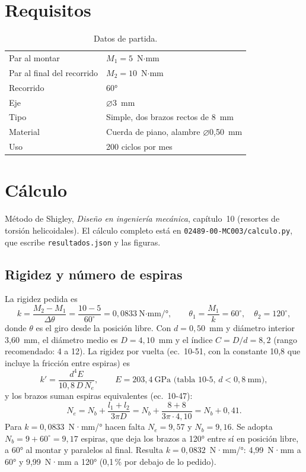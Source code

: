 \documentclass[11pt,a4paper]{article}
\begin{document}
\section{Requisitos}
\begin{table}[H]\centering\small
  \caption{Datos de partida.}
  \begin{tabular}{l l}
    \toprule
    Par al montar & $M_1 = 5$~N$\cdot$mm \\
    Par al final del recorrido & $M_2 = 10$~N$\cdot$mm \\
    Recorrido & 60° \\
    Eje & $\varnothing$3~mm \\
    Tipo & Simple, dos brazos rectos de 8~mm \\
    Material & Cuerda de piano, alambre $\varnothing$0,50~mm \\
    Uso & 200 ciclos por mes \\
    \bottomrule
  \end{tabular}
\end{table}

\section{Cálculo}
Método de Shigley, \emph{Diseño en ingeniería mecánica}, capítulo~10 (resortes de torsión helicoidales).
El cálculo completo está en \texttt{02489-00-MC003/calculo.py}, que escribe \texttt{resultados.json} y las figuras.

\subsection{Rigidez y número de espiras}
La rigidez pedida es
\[
  k = \frac{M_2 - M_1}{\Delta\theta} = \frac{10 - 5}{60^\circ} = 0{,}0833~\text{N·mm/°},
  \qquad \theta_1 = \frac{M_1}{k} = 60^\circ,\quad \theta_2 = 120^\circ,
\]
donde $\theta$ es el giro desde la posición libre. Con $d = 0{,}50$~mm y diámetro interior 3,60~mm, el
diámetro medio es $D = 4{,}10$~mm y el índice $C = D/d = 8{,}2$ (rango recomendado: 4 a 12).
La rigidez por vuelta (ec.~10-51, con la constante 10,8 que incluye la fricción entre espiras) es
\[
  k' = \frac{d^4 E}{10{,}8\,D\,N_e}, \qquad E = 203{,}4~\text{GPa (tabla 10-5, } d < 0{,}8~\text{mm)},
\]
y los brazos suman espiras equivalentes (ec.~10-47):
\[
  N_e = N_b + \frac{l_1 + l_2}{3\pi D} = N_b + \frac{8 + 8}{3\pi\cdot 4{,}10} = N_b + 0{,}41 .
\]
Para $k = 0{,}0833$~N·mm/° hacen falta $N_e = 9{,}57$ y $N_b = 9{,}16$. Se adopta
$N_b = 9 + 60^\circ = 9{,}17$ espiras, que deja los brazos a 120° entre sí en posición libre, a 60° al montar
y paralelos al final. Resulta $k = 0{,}0832$~N·mm/°: 4,99~N·mm a 60° y 9,99~N·mm a 120°
(0,1\,\% por debajo de lo pedido).
\end{document}
